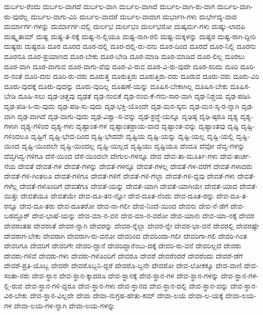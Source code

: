 {ದುರ್ಬಲ-ರೆಂದು
ದುರ್ಬಲ-ವಾಗದೆ
ದುರ್ಬಲ-ವಾಗಿ
ದುರ್ಬಲ-ವಾಗಿದೆ
ದುರ್ಬಲ-ವಾಗಿ-ರು-ವಾಗ
ದುರ್ಬಲ-ವಾಗಿ-ರು-ವುದೆಲ್ಲ
ದುರ್ಬಲ-ವಾಗು-ವಿರಿ
ದುರ್ಬಲ-ವಾದರೆ
ದುರ್ಬಲ-ವಾದಾಗ
ದುರ್ಭಾಗಿ-ಗಳು
ದುರ್ಭೇದ್ಯ-ವಾದ
ದುರ್ಮಾರ್ಗ-ಗಳನ್ನು
ದುರ್ಮಾರ್ಗ-ದಲ್ಲಿ
ದುರ್ಲಭ
ದುರ್ಲಭಂ
ದುರ್ಲಭರೋ
ದುಷ್ಕರ್ಮ-ಗಳು
ದುಷ್ಕು-ಲಾದಪಿ
ದುಷ್ಕೃತಾಮ್
ದುಷ್ಟ
ದುಷ್ಟ-ತ-ನಕ್ಕೆ
ದುಷ್ಟ-ನ-ಲ್ಲಿಯೂ
ದುಷ್ಟ-ನಾಗಿ-ರಲಿ
ದುಷ್ಟ-ಮಕ್ಕಳನ್ನು
ದುಷ್ಟರ
ದುಷ್ಟ-ರಾಗಿ-ದ್ದೀರಿ
ದುಷ್ಟರು
ದುಷ್ಟರೂ
ದೂರ
ದೂರದ
ದೂರ-ದಲ್ಲಿ
ದೂರ-ದಲ್ಲಿ-ರು-ವನು
ದೂರ-ದಿಂದ
ದೂರದೆ
ದೂರ-ನಿಲ್ಲಿ
ದೂರನು
ದೂರನೂ
ದೂರ-ಪ್ರಯಾಣದ
ದೂರ-ಬೇಕು
ದೂರ-ಬೇಡಿ
ದೂರ-ಮಾಡಿ
ದೂರ-ಮಾಡಿದ
ದೂರ-ಲಿಲ್ಲ
ದೂರಲು
ದೂರ-ವಾಗಿ
ದೂರ-ವಾಗುವ
ದೂರ-ವಾಗು-ವೆವು
ದೂರ-ವಿ-ರುವ
ದೂರ-ವಿ-ರು-ವುದೇ
ದೂರ-ಸರಿದು
ದೂರಿ
ದೂರಿ-ದ-ನಂತೆ
ದೂರಿ-ದನು
ದೂರಿ-ರು-ವರು
ದೂರುತ್ತ
ದೂರುತ್ತಿರು
ದೂರುತ್ತಿರು-ವರು
ದೂರುವ
ದೂರು-ವರು
ದೂರು-ವಿರಿ
ದೂರು-ವುದಕ್ಕೆ
ದೂರು-ವುದನ್ನು
ದೂರು-ವುದಿಲ್ಲ
ದೂಷಣೆ-ಯನ್ನು
ದೂಷಿಸ-ಬೇಕಾಗಿಲ್ಲ
ದೂಷಿಸ-ಬೇಕು
ದೂಷಿಸ-ಬೇಡಿ
ದೂಷಿ-ಸಲು
ದೃಢ-ಚಿತ್ತವು
ದೃಢತೆ
ದೃಢ-ನಂಬಿಕೆ
ದೃಢ-ನಂಬಿ-ಕೆ-ಗನು-ಸಾರ-ವಾಗಿ
ದೃಢ-ನಿಶ್ಚಯ
ದೃಢ-ಪಡಿಸಿ
ದೃಢ-ಪಡಿ-ಸಿ-ರು-ವುದು
ದೃಢ-ಪಡಿ-ಸು-ವುದು
ದೃಢ-ಭಕ್ತಿ-ಯೊಂದೇ
ದೃಢ-ಮನ-ಸ್ಕನು
ದೃಢ-ಮನ-ಸ್ಕ-ರ-ನ್ನಾಗಿ
ದೃಢ-ವಾಗಿ
ದೃಢ-ವಾಗಿದೆ
ದೃಢ-ವಾಗು-ವುದು
ದೃಢ-ವಿಶ್ವಾ-ಸ-ವನ್ನು
ದೃಢ-ಶ್ರದ್ಧೆ-ಯನ್ನೂ
ದೃಢಿಷ್ಠ
ದೃಢಿ-ಷ್ಠರೂ
ದೃಶ್ಯ
ದೃಶ್ಯ-ಗಳಾಗಿ
ದೃಶ್ಯ-ಗಳಿಂದ
ದೃಶ್ಯ-ಗಳು
ದೃಷ್ಟಾಂತ-ಗಳ
ದೃಷ್ಟಾಂತಪ್ರಾಯ-ವಾದ
ದೃಷ್ಟಾಂತ-ವನ್ನು
ದೃಷ್ಟಾಂತವು
ದೃಷ್ಟಿ
ದೃಷ್ಟಿ-ಗಳಿಂದಲೂ
ದೃಷ್ಟಿಗೆ
ದೃಷ್ಟಿ-ಭೇದ-ದಿಂದ
ದೃಷ್ಟಿ-ಭೇದವೇ
ದೃಷ್ಟಿಯ
ದೃಷ್ಟಿ-ಯನ್ನು
ದೃಷ್ಟಿ-ಯಲ್ಲ
ದೃಷ್ಟಿ-ಯಲ್ಲಿ
ದೃಷ್ಟಿ-ಯಿಂದ
ದೃಷ್ಟಿ-ಯಿಂದಲೇ
ದೃಷ್ಟಿ-ಯಿಂದಲ್ಲ
ದೃಷ್ಟಿ-ಯಿಲ್ಲದ
ದೃಷ್ಟಿಯು
ದೃಷ್ಟಿಯೂ
ದೆಂದೂ
ದೆವೋ
ದೆವ್ವ-ಗಳನ್ನು
ದೆವ್ವಗಿವ್ವ-ಗಳಿಗೂ
ದೆಸೆ-ಯಿಂದ
ದೆಸೆ-ಯಿಂದಲೇ
ದೇಗುಲ-ಗಳನ್ನೂ
ದೇವ
ದೇವ-ತಾ-ಮೂರ್ತಿ-ಗಳು
ದೇವ-ತಾರ್ಚ-ನೆಯ
ದೇವತೆ
ದೇವತೆ-ಗಳ
ದೇವತೆ-ಗಳನ್ನು
ದೇವತೆ-ಗಳನ್ನೂ
ದೇವತೆ-ಗಳಲ್ಲ
ದೇವತೆ-ಗಳ-ವರೆಗೆ
ದೇವತೆ-ಗಳಾದರು
ದೇವತೆ-ಗಳಿ-ಗಿಂತಲೂ
ದೇವತೆ-ಗಳಿಗೂ
ದೇವತೆ-ಗಳಿಗೆ
ದೇವತೆ-ಗಳಿ-ಗೆಲ್ಲಾ
ದೇವತೆ-ಗಳಿ-ದ್ದವು
ದೇವತೆ-ಗಳು
ದೇವತೆ-ಗಳೆಲ್ಲ
ದೇವತೆ-ಗಳೊಂದಿಗೆ
ದೇವತೆಗೂ
ದೇವತೆ-ಯನ್ನು
ದೇವತೆ-ಯಾಗಿ
ದೇವತೆ-ಯಾಗಿಯೇ
ದೇವತೆ-ಯಾದ
ದೇವತೆ-ಯಿತ್ತು
ದೇವತೆಯೂ
ದೇವತೆಯೇ
ದೇವ-ದೂ-ತನ-ನ್ನೋ
ದೇವ-ದೂತ-ನೆಂದು
ದೇವ-ದೂತ-ರನ್ನು
ದೇವ-ದೂ-ತ-ರನ್ನೂ
ದೇವ-ದೂ-ತರು
ದೇವ-ದೂತರೋ
ದೇವ-ನಾ-ಗಲೀ
ದೇವ-ನಿಂದೆ-ಯಿಂದ
ದೇವನು
ದೇವ-ನೆ-ಡೆಗೆ
ದೇವ-ಬಹದ್ದೂರ್
ದೇವ-ಭಾಷೆ-ಯನ್ನು
ದೇವ-ಮಾ-ನ-ವನ
ದೇವ-ಮಾ-ನ-ವರೋ
ದೇವ-ಯಾನಃ
ದೇವ-ಯಾ-ನಕ್ಕೆ
ದೇವರ
ದೇವರಂತಹ
ದೇವರಂತೆ
ದೇವರ-ನ್ನಾಗಿ
ದೇವರನ್ನು
ದೇವರ-ನ್ನೆಲ್ಲಾ
ದೇವರ-ನ್ನೇ
ದೇವರ-ಭಾ-ವನೆ
ದೇವರಲ್ಲಿ
ದೇವರಷ್ಟೇ
ದೇವರಾಗ-ಬೇಕು
ದೇವರಾಗಿ
ದೇವರಾಗಿ-ರು-ವನೋ
ದೇವರಿಂದ
ದೇವರಿಂದಾ-ಗಲೀ
ದೇವರಿಗಾ-ಗಲಿ
ದೇವರಿ-ಗಿಂತ
ದೇವರಿಗೂ
ದೇವರಿಗೆ
ದೇವರಿಗೇ
ದೇವರಿ-ದ್ದಾನೆ
ದೇವರಿದ್ದಾನೆಂಬು-ದಕ್ಕೆ
ದೇವರಿ-ರು-ವನೆ
ದೇವರಿಲ್ಲದೆ
ದೇವರು
ದೇವರು-ಗಳಿವೆ
ದೇವರು-ಗಳು
ದೇವರು-ಗಳೊಂದಿಗೆ
ದೇವರೂ
ದೇವರೆ
ದೇವರೆಂದರೆ
ದೇವರೆಂದು
ದೇವರೆ-ಡೆಗೆ
ದೇವರೆ-ಪ್ರತಿ-ಯೊಬ್ಬ
ದೇವರೇ
ದೇವರೊಬ್ಬನಿ-ದ್ದರೆ
ದೇವರೊ-ಬ್ಬನೇ
ದೇವರೋ
ದೇವ-ಲೋಕಕ್ಕೂ
ದೇವ-ವಾಣಿ
ದೇವ-ಸಂತಾ-ನರು
ದೇವ-ಸ್ಥಾನ
ದೇವ-ಸ್ಥಾನ-ಕ್ಕಾದರೂ
ದೇವ-ಸ್ಥಾನಕ್ಕೆ
ದೇವ-ಸ್ಥಾನ-ಗಳ
ದೇವ-ಸ್ಥಾನ-ಗಳನ್ನು
ದೇವ-ಸ್ಥಾನ-ಗಳ-ಲ್ಲಿ-ರುವ
ದೇವ-ಸ್ಥಾನ-ಗಳಿ-ದ್ದರೂ
ದೇವ-ಸ್ಥಾನ-ಗಳು
ದೇವ-ಸ್ಥಾನದ
ದೇವ-ಸ್ಥಾನ-ದಲ್ಲಿ
ದೇವ-ಸ್ಥಾನ-ವನ್ನು
ದೇವ-ಸ್ಥಾನ-ವಿರ-ಬೇಕು
ದೇವ-ಸ್ಥಾನ-ವಿಲ್ಲದೇ
ದೇವಾ
ದೇವಾ-ನುಗ್ರಹ-ಹೇತು-ಕಮ್
ದೇವಾ-ಲಯ
ದೇವಾ-ಲ-ಯಕ್ಕೆ
ದೇವಾ-ಲಯ-ಗಳ
ದೇವಾ-ಲಯ-ಗಳ-ನ್ನಾಗಿ
ದೇವಾ-ಲಯ-ಗಳನ್ನು
}
